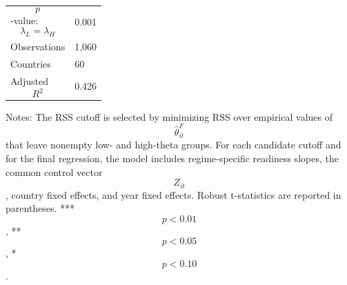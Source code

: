 \begin{table}[H]
\begin{threeparttable}
\begin{tabularx}{\textwidth}{lY}
$$p$$-value: $$\lambda_L=\lambda_H$$ & 0.001 \\
Observations & 1,060 \\
Countries & 60 \\
Adjusted $$R^2$$ & 0.426 \\
\bottomrule
\end{tabularx}
\begin{tablenotes}[flushleft]\footnotesize
\item Notes: The RSS cutoff is selected by minimizing RSS over empirical values of $$\widehat{\theta}^{F}_{it}$$ that leave nonempty low- and high-theta groups. For each candidate cutoff and for the final regression, the model includes regime-specific readiness slopes, the common control vector $$Z_{it}$$, country fixed effects, and year fixed effects. Robust t-statistics are reported in parentheses. *** $$p<0.01$$, ** $$p<0.05$$, * $$p<0.10$$.
\end{tablenotes}
\end{threeparttable}
\end{table}
